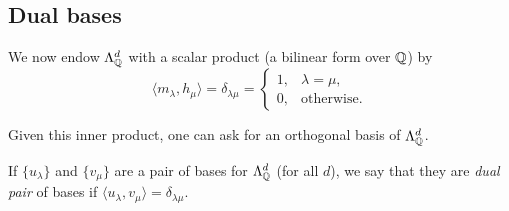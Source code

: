 \subsection{Dual bases}

	We now endow $\Lambda_{\mathbb{Q}}^d$ with a scalar product (a bilinear form over $\mathbb{Q}$) by
	\[ \langle m_\lambda , h_\mu \rangle = \delta_{\lambda\mu} = \begin{cases} 1, & \lambda = \mu, \\ 0, & \text{otherwise.} \end{cases} \]
	
	Given this inner product, one can ask for an orthogonal basis of $\Lambda_{\mathbb{Q}}^d$.

	\begin{fdef}
		If $\{u_\lambda\}$ and $\{v_\mu\}$ are a pair of bases for $\Lambda_{\mathbb{Q}}^d$ (for all $d$), we say that they are \emph{dual pair} of bases if $\langle u_\lambda , v_\mu \rangle = \delta_{\lambda\mu}$.
	\end{fdef}

